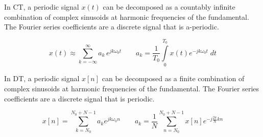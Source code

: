 In CT, a periodic signal $x(t)$ can be decomposed as a countably infinite combination of complex sinusoids at harmonic frequencies of the fundamental. The Fourier series coefficients are a discrete signal that is a-periodic.

\[
x(t) \approx \sum\limits_{k = -\infty}^{\infty} a_k \, e^{j k\omega_0 t}
\hspace{2em}
a_k = \frac{1}{T_0} \int\limits_{0}^{T_0} x(t)e^{-jk\omega_0 t} \; dt
\]

In DT, a periodic signal $x[n]$ can be decomposed as a finite combination of complex sinusoids at harmonic frequencies of the fundamental. The Fourier series coefficients are a discrete signal that is periodic.

\[  
x[n] = \sum\limits_{k = N_0}^{N_0 + N-1} a_k e^{jk\omega_0n}
\hspace{2em}
a_k = \frac{1}{N} \sum\limits_{n = N_0}^{N_0+N-1} x[n]e^{-j\frac{2\pi}{N} k n }
\]
